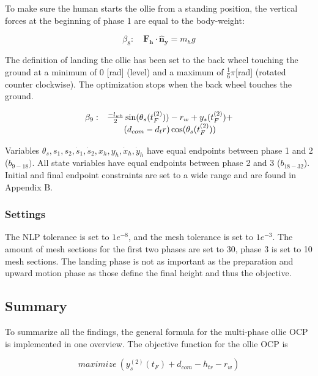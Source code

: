 \documentclass[default,iicol]{sn-jnl}
\theoremstyle{thmstyleone}%
\theoremstyle{thmstyletwo}%
\theoremstyle{thmstylethree}%
\begin{document}
To make sure the human starts the ollie from a standing position, the vertical forces at the beginning of phase 1 are equal to the body-weight:

\begin{equation}
    \beta_8: \quad \mathbf{F_h} \cdot \mathbf{\hat n_y} = m_h g
\end{equation}

The definition of landing the ollie has been set to the back wheel touching the ground at a minimum of 0 [rad] (level) and a maximum of $\frac{1}{6} \pi$[rad] (rotated counter clockwise). The optimization stops when the back wheel touches the ground.

\begin{equation}
\begin{array}{l c}
\beta_9 : & \frac{-l_{wb}}{2} \sin(\theta_s(t_F^{(2)})) - r_w + y_s(t_F^{(2)}) + \\ 
& (d_{com} - {d_tr}) \cos(\theta_s(t_F^{(2)}))
\end{array}
\end{equation}

Variables $\theta_s, s_1, s_2, \dot s_1, \dot s_2, x_h, y_h, \dot x_h, \dot y_h$ have equal endpoints between phase 1 and 2 ($b_{9-18})$. All state variables have equal endpoints between phase 2 and 3 ($b_{18-32}$). Initial and final endpoint constraints are set to a wide range and are found in Appendix B.

\subsubsection{Settings}\label{s_settings}
The NLP tolerance is set to $1e^{-8}$, and the mesh tolerance is set to $1e^{-3}$. The amount of mesh sections for the first two phases are set to 30, phase 3 is set to 10 mesh sections. The landing phase is not as important as the preparation and upward motion phase as those define the final height and thus the objective.

\subsection{Summary}\label{s_summary}
To summarize all the findings, the general formula for the multi-phase ollie OCP is implemented in one overview. The objective function for the ollie OCP is 

\begin{equation}
     maximize\ (y_s^{(2)}(t_F) + d_{com} - h_{tr} - r_w)
\end{equation} 
\end{document}

